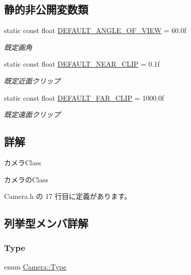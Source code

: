 \subsection*{静的非公開変数類}
\begin{DoxyCompactItemize}
\item 
static const float \mbox{\hyperlink{class_camera_a4c0adb132f7021b25c1765914197c330}{D\+E\+F\+A\+U\+L\+T\+\_\+\+A\+N\+G\+L\+E\+\_\+\+O\+F\+\_\+\+V\+I\+EW}} = 60.\+0f
\begin{DoxyCompactList}\small\item\em 既定画角 \end{DoxyCompactList}\item 
static const float \mbox{\hyperlink{class_camera_a0c53b37bfc18f468b1a14e74ff8fec7e}{D\+E\+F\+A\+U\+L\+T\+\_\+\+N\+E\+A\+R\+\_\+\+C\+L\+IP}} = 0.\+1f
\begin{DoxyCompactList}\small\item\em 既定近面クリップ \end{DoxyCompactList}\item 
static const float \mbox{\hyperlink{class_camera_a67838c152145b91ed68e401f58bb08bf}{D\+E\+F\+A\+U\+L\+T\+\_\+\+F\+A\+R\+\_\+\+C\+L\+IP}} = 1000.\+0f
\begin{DoxyCompactList}\small\item\em 既定遠面クリップ \end{DoxyCompactList}\end{DoxyCompactItemize}


\subsection{詳解}
カメラ\+Class 

カメラの\+Class 

 Camera.\+h の 17 行目に定義があります。



\subsection{列挙型メンバ詳解}
\mbox{\label{class_camera_a3b0a1f58deca679ac665f61c480d1dcb}} 
\subsubsection{\texorpdfstring{Type}{Type}}
{\footnotesize\ttfamily enum \mbox{\hyperlink{class_camera_a3b0a1f58deca679ac665f61c480d1dcb}{Camera\+::\+Type}}\hspace{0.3cm}{\ttfamily [strong]}}

